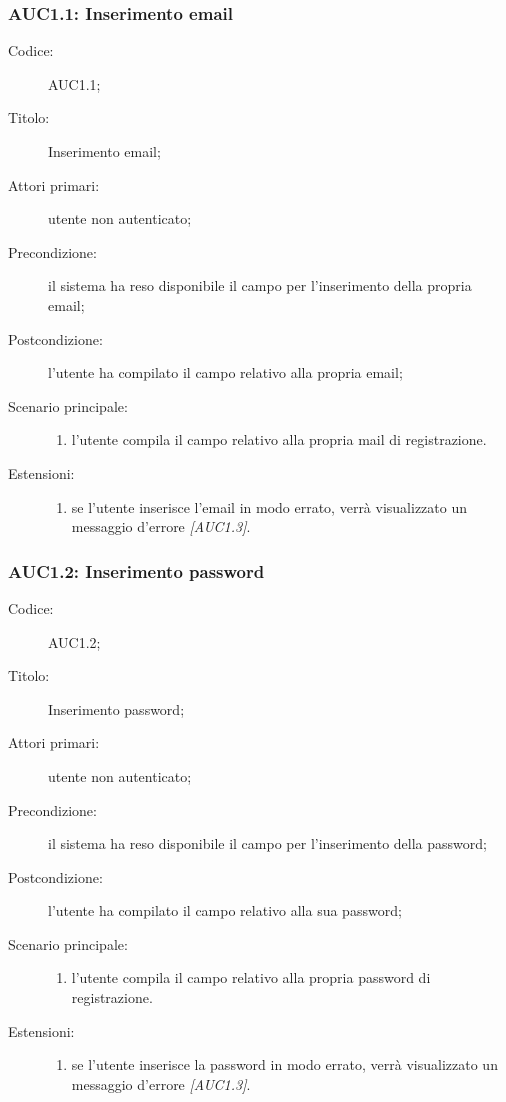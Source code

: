 \documentclass[../../../analisi-dei-requisiti.tex]{subfiles}
\begin{document}
\subsubsection{AUC1.1: Inserimento email}%
\label{subs:AUC1.1}
\begin{description}
  \item[Codice:] AUC1.1;
  \item[Titolo:] Inserimento email;
  \item[Attori primari:] utente non autenticato;
  \item[Precondizione:] il sistema ha reso disponibile il campo per l'inserimento della propria email;
  \item[Postcondizione:] l'utente ha compilato il campo relativo alla propria email;
  \item[Scenario principale:]
  \begin{enumerate}
    \item l'utente compila il campo relativo alla propria mail di registrazione.
  \end{enumerate}
  \item[Estensioni:]
  \begin{enumerate}
    \item se l'utente inserisce l'email in modo errato, verrà visualizzato un messaggio d'errore \emph{[AUC1.3]}.
  \end{enumerate}
\end{description}

\subsubsection{AUC1.2: Inserimento password}%
\label{subs:AUC1.2}
\begin{description}
  \item[Codice:] AUC1.2;
  \item[Titolo:] Inserimento password;
  \item[Attori primari:] utente non autenticato;
  \item[Precondizione:] il sistema ha reso disponibile il campo per l'inserimento della password;
  \item[Postcondizione:] l'utente ha compilato il campo relativo alla sua password;
  \item[Scenario principale:]
  \begin{enumerate}
    \item l'utente compila il campo relativo alla propria password di registrazione.
  \end{enumerate}
  \item[Estensioni:]
  \begin{enumerate}
    \item se l'utente inserisce la password in modo errato, verrà visualizzato un messaggio d'errore \emph{[AUC1.3]}.
  \end{enumerate}
\end{description}
\end{document}
